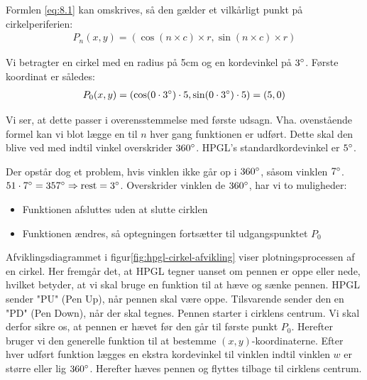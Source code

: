 Formlen \vref{eq:8.1} kan omskrives, så den gælder et vilkårligt punkt
på cirkelperiferien:
\begin{align}
P_n(x, y)=(\cos(n\times c)\times r, \sin(n\times c)\times r)
\end{align}

Vi betragter en cirkel med en radius på 5cm og en kordevinkel på
$3^\circ$. Første koordinat er således:
\begin{align*}
P_0(x, y)&=(\cos(0\cdot 3^\circ)\cdot 5 , \sin(0\cdot 3^\circ)\cdot 5)=(5, 0) \\
\end{align*}

Vi ser, at dette passer i overensstemmelse med første
udsagn. Vha. ovenstående formel kan vi blot lægge en til $n$ hver gang
funktionen er udført. Dette skal den blive ved med indtil vinkel
overskrider $360^\circ$. HPGL's standardkordevinkel er $5^\circ$.


Der opstår dog et problem, hvis vinklen ikke går op i $360^\circ$,
såsom vinklen $7^\circ$. $51\cdot 7^\circ = 357^\circ \Rightarrow
\textup{rest} = 3^\circ$. Overskrider vinklen de $360^\circ$, har vi to
muligheder:
\begin{itemize} \firmlist
\item Funktionen afsluttes uden at slutte cirklen
\item Funktionen ændres, så optegningen fortsætter til udgangspunktet $P_0$
\end{itemize}

Afviklingsdiagrammet i figur\vref{fig:hpgl-cirkel-afvikling}
viser plotningsprocessen af en cirkel. Her fremgår det, at
HPGL tegner uanset om pennen er oppe eller nede, hvilket betyder, at
vi skal bruge en funktion til at hæve og sænke pennen. HPGL sender
"PU" (Pen Up), når pennen skal være oppe. Tilsvarende sender den en
"PD" (Pen Down), når der skal tegnes. Pennen starter i cirklens
centrum. Vi skal derfor sikre os, at pennen er hævet før den går til
første punkt $P_0$. Herefter bruger vi den generelle funktion til at
bestemme $(x, y)$-koordinaterne. Efter hver udført funktion lægges en
ekstra kordevinkel til vinklen indtil vinklen $w$ er større eller lig
$360^\circ$. Herefter hæves pennen og flyttes tilbage til cirklens
centrum.

